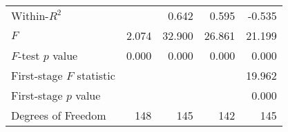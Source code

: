 \begin{tabular}{lrrrr}
Within-$R^2$              &          &    0.642 &     0.595 &                         -0.535 \\ 
$F$                       &    2.074 &   32.900 &    26.861 &                         21.199 \\ 
$F$-test $p$ value        &    0.000 &    0.000 &     0.000 &                          0.000 \\ 
First-stage $F$ statistic &          &          &           &                         19.962 \\ 
First-stage $p$ value     &          &          &           &                          0.000 \\ 
Degrees of Freedom        &      148 &      145 &       142 &                            145 \\ 
\bottomrule
\end{tabular}
